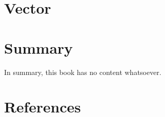 \documentclass[
  letterpaper,
  DIV=11,
  numbers=noendperiod]{scrreport}
\begin{document}
\hypertarget{sec-vector}{%
\chapter{Vector}\label{sec-vector}}


\hypertarget{summary}{%
\chapter{Summary}\label{summary}}

In summary, this book has no content whatsoever.


\hypertarget{references}{%
\chapter*{References}\label{references}}


\printbibliography[heading=none]
\end{document}
